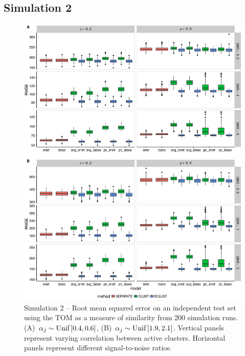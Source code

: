 \subsection*{Simulation 2}
\begin{figure}[H]
	\centering
	\includegraphics[scale=0.55, keepaspectratio]{./figs/hydra/results/figures/sim2-sept8/RMSE_TOM_sim2.png}
	\caption{Simulation 2 -- Root mean squared error on an independent test set using the TOM as a measure of similarity from 200 simulation runs. \mbox{(A) $\alpha_{j} \sim \textrm{{Unif}}\left[0.4, 0.6\right]$}, \mbox{(B) $\alpha_{j} \sim \textrm{{Unif}}\left[1.9, 2.1\right]$}. Vertical panels represent varying correlation between active clusters. Horizontal panels represent different signal-to-noise ratios.}
	\label{fig:RMSE_TOM_sim2}
\end{figure}

